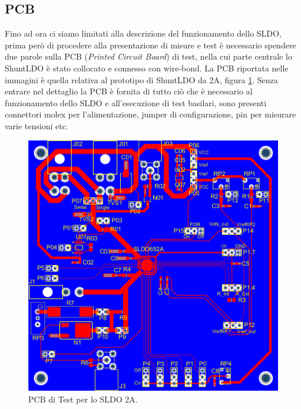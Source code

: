 \subsection{PCB}
Fino ad ora ci siamo limitati alla descrizione del funzionamento dello SLDO, prima però di procedere alla presentazione di misure e test è necessario spendere due parole sulla PCB (\textit{Printed Circuit Board}) di test, nella cui parte centrale lo ShuntLDO è stato collocato e connesso con wire-bond. La PCB riportata nelle immagini è quella relativa al prototipo di ShuntLDO da 2A, figura \ref{PCBTestSLDO}. Senza entrare nel dettaglio la PCB è fornita di tutto ciò che è necessario al funzionamento dello SLDO e all'esecuzione di test basilari, sono presenti connettori molex per l'alimentazione, jumper di configurazione, pin per misurare varie tensioni etc.
\begin{figure}
\centering
\includegraphics[scale=.3]{Immagini/chipcard}
\caption{PCB di Test per lo SLDO 2A.}
\label{PCBTestSLDO}
\end{figure}


